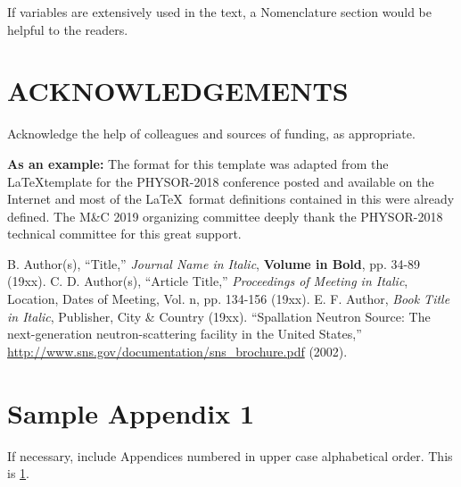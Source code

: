 \documentclass[letterpaper]{mandc2019}
\begin{document}
If variables are extensively used in the text, a Nomenclature section would be helpful to the readers.

\section*{ACKNOWLEDGEMENTS}

Acknowledge the help of colleagues and sources of funding, as appropriate.

\textbf{As an example:} The format for this template was adapted from the \LaTeX template for the PHYSOR-2018 conference posted and available on the Internet and 
most of the \LaTeX\ format definitions contained in this were already defined. The 
M\&C 2019 organizing committee deeply thank the PHYSOR-2018 technical committee 
for this great support.

% 
% 

\setlength{\baselineskip}{12pt}
\begin{thebibliography}{300}
 B. Author(s), ``Title,'' \emph{Journal Name in Italic}, 
  \textbf{Volume in Bold}, pp. 34-89 (19xx).
 C. D. Author(s), ``Article Title,'' \emph{Proceedings of
  Meeting in Italic}, Location, Dates of Meeting, Vol. n, pp. 134-156 
  (19xx).
 E. F. Author, \emph{Book Title in Italic}, Publisher, City \&
  Country (19xx). 
 ``Spallation Neutron Source: The next-generation 
  neutron-scattering facility in the United States,'' 
  \url{http://www.sns.gov/documentation/sns\_brochure.pdf} (2002).
\end{thebibliography}

\appendix
\gdef\thesection{APPENDIX \Alph{section}}
\section{Sample Appendix 1}
\label{app:a}
If necessary, include Appendices numbered in upper case alphabetical order. This is \ref{app:a}. 
\end{document}

